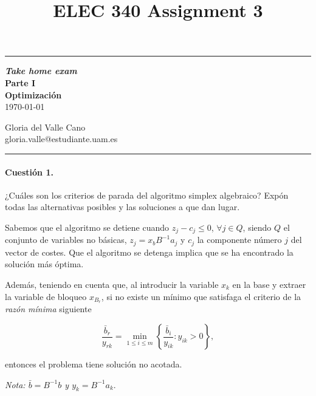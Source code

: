 \documentclass[12pt]{scrartcl}
\title{ELEC 340 Assignment 3}
\begin{document}
\begin{center}
	\hrule
	\vspace{.4cm}
	{\textbf { \large \textit{Take home exam} \\ Parte I \\ \vspace{1em} Optimización} \\ \today}
\end{center}
\begin{center}
{ \vspace{0.5em} Gloria del Valle Cano \hspace{\fill}   \\}
{ gloria.valle@estudiante.uam.es \hspace{\fill} \\ \vspace{1.5em}}
	\hrule
\end{center}

\begin{boxF}
\paragraph*{Cuestión 1.}¿Cuáles son los criterios de parada del algoritmo simplex algebraico? Expón todas las alternativas posibles y las soluciones a que dan lugar.
\end{boxF}

Sabemos que el algoritmo se detiene cuando $z_j -c_j \leq 0$, $\forall j \in Q$, siendo $Q$ el conjunto de variables no básicas, $z_j = x_bB^{-1}a_j$ y $c_j$ la componente número $j$ del vector de costes. Que el algoritmo se detenga implica que se ha encontrado la solución más óptima.

\vspace{0.5em}

Además, teniendo en cuenta que, al introducir la variable $x_k$ en la base y extraer la variable de bloqueo $x_{B_r}$, si no existe un mínimo que satisfaga el criterio de la \textit{razón mínima} siguiente

$$
\frac{\bar b_r}{y_{rk}} = \min_{1\leq i \leq m} \left\{ \frac{\bar b_i}{y_{ik}} : y_{ik} > 0 \right\},
$$

entonces el problema tiene solución no acotada.

\vspace{0.5em}

\textit{Nota: $\bar b = B^{-1}b$ y $y_k = B^{-1}a_k$}.

\vspace{1em}
\end{document}
